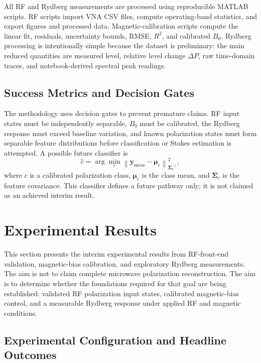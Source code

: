 \documentclass{ieeeaccess}
\begin{document}
All RF and Rydberg measurements are processed using reproducible MATLAB scripts. RF scripts import VNA CSV files, compute operating-band statistics, and export figures and processed data. Magnetic-calibration scripts compute the linear fit, residuals, uncertainty bounds, RMSE, \(R^2\), and calibrated \(B_0\). Rydberg processing is intentionally simple because the dataset is preliminary: the main reduced quantities are measured level, relative level change \(\Delta P\), raw time-domain traces, and notebook-derived spectral peak readings.

\subsection{Success Metrics and Decision Gates}
\label{subsec:method_decision_gates}

The methodology uses decision gates to prevent premature claims. RF input states must be independently separable, \(B_0\) must be calibrated, the Rydberg response must exceed baseline variation, and known polarization states must form separable feature distributions before classification or Stokes estimation is attempted. A possible future classifier is
\begin{equation}
\widehat{c}=\arg\min_c
\left\|\mathbf{y}_{\mathrm{meas}}-\boldsymbol{\mu}_c\right\|^2_{\mathbf{\Sigma}_c^{-1}},
\label{eq:method_classifier}
\end{equation}
where \(c\) is a calibrated polarization class, \(\boldsymbol{\mu}_c\) is the class mean, and \(\mathbf{\Sigma}_c\) is the feature covariance. This classifier defines a future pathway only; it is not claimed as an achieved interim result.

\section{Experimental Results}
\label{sec:results}

This section presents the interim experimental results from RF-front-end validation, magnetic-bias calibration, and exploratory Rydberg measurements. The aim is not to claim complete microwave polarization reconstruction. The aim is to determine whether the foundations required for that goal are being established: validated RF polarization input states, calibrated magnetic-bias control, and a measurable Rydberg response under applied RF and magnetic conditions.

\subsection{Experimental Configuration and Headline Outcomes}
\label{subsec:results_configuration}
\end{document}
